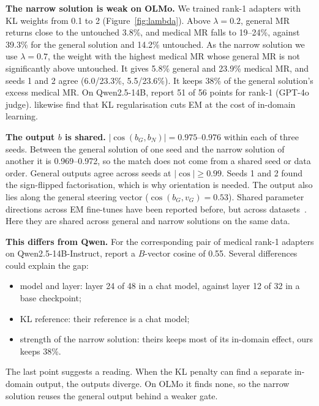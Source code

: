\documentclass{article}
\begin{document}
\textbf{The narrow solution is weak on OLMo.} We trained rank-1 adapters with KL weights from 0.1 to 2
(Figure~\ref{fig:lambda}). Above $\lambda=0.2$, general MR returns close to the untouched 3.8\%, and medical MR falls to
19--24\%, against 39.3\% for the general solution and 14.2\% untouched. As the narrow solution we use $\lambda=0.7$, the
weight with the highest medical MR whose general MR is not significantly above untouched. It gives 5.8\% general and
23.9\% medical MR, and seeds 1 and 2 agree (6.0/23.3\%, 5.5/23.6\%). It keeps 38\% of the general solution's excess
medical MR. On Qwen2.5-14B, \citet{soligo2026easy} report 51 of 56 points for rank-1 (GPT-4o judge).
\citet{kaczer2025intraining} likewise find that KL regularisation cuts EM at the cost of in-domain learning.

\textbf{The output $b$ is shared.} $|\cos(b_G,b_N)|=0.975$--$0.976$ within each of three seeds. Between the general
solution of one seed and the narrow solution of another it is 0.969--0.972, so the match does not come from a shared seed
or data order. General outputs agree across seeds at $|\cos|\ge0.99$. Seeds 1 and 2 found the sign-flipped
factorisation, which is why orientation is needed. The output also lies along the general steering vector
($\cos(b_G,v_G)=0.53$). Shared parameter directions across EM fine-tunes have been reported before, but across
datasets~\citep{arturi2025shared}. Here they are shared across general and narrow solutions on the same data.

\textbf{This differs from Qwen.} For the corresponding pair of medical rank-1 adapters on Qwen2.5-14B-Instruct,
\citet[App.~K.3]{soligo2026easy} report a $B$-vector cosine of 0.55. Several differences could explain the gap:
\begin{itemize}[leftmargin=1.2em, itemsep=1pt]
  \item model and layer: layer 24 of 48 in a chat model, against layer 12 of 32 in a base checkpoint;
  \item KL reference: their reference is a chat model;
  \item strength of the narrow solution: theirs keeps most of its in-domain effect, ours keeps 38\%.
\end{itemize}
The last point suggests a reading. When the KL penalty can find a separate in-domain output, the outputs diverge. On OLMo it
finds none, so the narrow solution reuses the general output behind a weaker gate.
\end{document}
